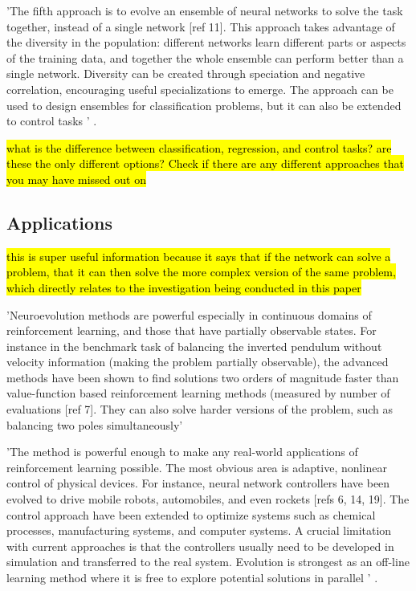 'The fifth approach is to evolve an ensemble of neural networks to solve the task together, instead of a single network [ref 11]. This approach takes advantage of the diversity in the population: different networks learn different parts or aspects of the training data, and together the whole ensemble can perform better than a single network. Diversity can be created through speciation and negative correlation, encouraging useful specializations to emerge. The approach can be used to design ensembles for classification problems, but it can also be extended to control tasks ' \cite{Miikkulainen2010}.

\hl{what is the difference between classification, regression, and control tasks? are these the only different options? Check if there are any different approaches that you may have missed out on}


\subsection{Applications}

\hl{this is super useful information because it says that if the network can solve a problem, that it can then solve the more complex version of the same problem, which directly relates to the investigation being conducted in this paper}

'Neuroevolution methods are powerful especially in continuous domains of reinforcement learning, and those that have partially observable states. For instance in the benchmark task of balancing the inverted pendulum without velocity information (making the problem partially observable), the advanced methods have been shown to find solutions two orders of magnitude faster than value-function based reinforcement learning methods (measured by number of evaluations [ref 7]. They can also solve harder versions of the problem, such as balancing two poles simultaneously'

'The method is powerful enough to make any real-world applications of reinforcement learning possible. The most obvious area is adaptive, nonlinear control of physical devices. For instance, neural network controllers have been evolved to drive mobile robots, automobiles, and even rockets [refs 6, 14, 19]. The control approach have been extended to optimize systems such as chemical processes, manufacturing systems, and computer systems. A crucial limitation with current approaches is that the controllers usually need to be developed in simulation and transferred to the real system. Evolution is strongest as an off-line learning method where it is free to explore potential solutions in parallel ' \cite{Miikkulainen2010}.

